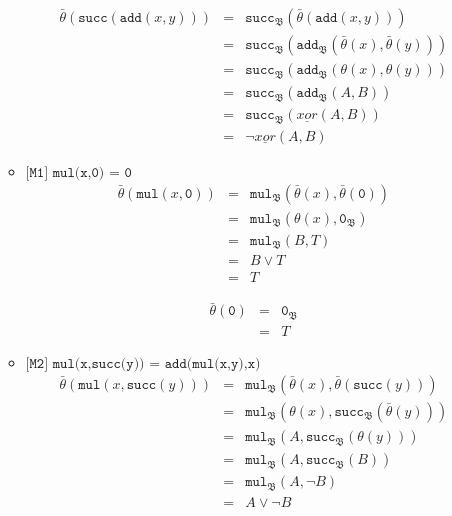 \documentclass[a4paper,11pt]{article}
\begin{document}
\begin{enumerate}
\begin{itemize}
\begin{eqnarray*}
\bar \theta(\texttt{succ}(\texttt{add}(x,y))) & = & \texttt{succ}_{\mathfrak{B}}(\bar \theta(\texttt{add}(x, y))) \\
                                              & = & \texttt{succ}_{\mathfrak{B}}(\texttt{add}_{\mathfrak{B}}(\bar \theta(x), \bar \theta(y))) \\
                                              & = & \texttt{succ}_{\mathfrak{B}}(\texttt{add}_{\mathfrak{B}}(\theta(x), \theta(y))) \\
                                              & = & \texttt{succ}_{\mathfrak{B}}(\texttt{add}_{\mathfrak{B}}(A, B)) \\
                                              & = & \texttt{succ}_{\mathfrak{B}}(\underline{xor}(A, B)) \\
                                              & = & \neg \underline{xor}(A, B)
\end{eqnarray*}

\item{$\texttt{[M1] mul(x,0) = 0}$}
\begin{eqnarray*}
\bar \theta(\texttt{mul}(x, \texttt{0})) & = & \texttt{mul}_{\mathfrak{B}}(\bar \theta(x), \bar \theta(\texttt{0})) \\
                                         & = & \texttt{mul}_{\mathfrak{B}}(\theta(x), \texttt{0}_{\mathfrak{B}}) \\
                                         & = & \texttt{mul}_{\mathfrak{B}}(B, T) \\
                                         & = & B \vee T \\
                                         & = & T
\end{eqnarray*}

\begin{eqnarray*}
\bar \theta(\texttt{0}) & = & \texttt{0}_{\mathfrak{B}} \\
                        & = & T
\end{eqnarray*}

\item{$\texttt{[M2] mul(x,succ(y)) = add(mul(x,y),x)}$}
\begin{eqnarray*}
\bar \theta(\texttt{mul}(x, \texttt{succ}(y))) & = & \texttt{mul}_{\mathfrak{B}}(\bar \theta(x), \bar \theta(\texttt{succ}(y))) \\
                                               & = & \texttt{mul}_{\mathfrak{B}}(\theta(x), \texttt{succ}_{\mathfrak{B}}(\bar \theta(y))) \\
                                               & = & \texttt{mul}_{\mathfrak{B}}(A, \texttt{succ}_{\mathfrak{B}}(\theta(y))) \\
                                               & = & \texttt{mul}_{\mathfrak{B}}(A, \texttt{succ}_{\mathfrak{B}}(B)) \\
                                               & = & \texttt{mul}_{\mathfrak{B}}(A, \neg B) \\
                                               & = & A \vee \neg B
\end{eqnarray*}


\end{itemize}
\end{enumerate}
\end{document}
